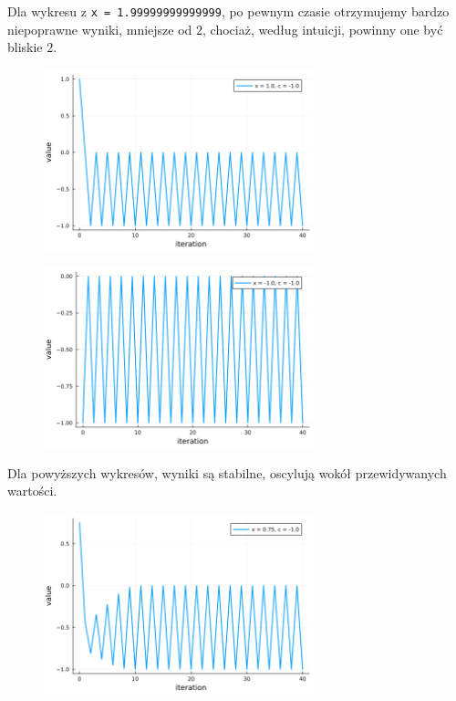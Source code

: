 \documentclass[15pt, a4paper]{article}
\begin{document}
\vspace{0.5cm}

\noindent Dla wykresu z \verb|x = 1.99999999999999|, po pewnym czasie otrzymujemy bardzo niepoprawne wyniki, mniejsze od 2, chociaż, według intuicji, powinny one być bliskie 2.

\vspace{0.5cm}

\begin{figure}[h]
    \centering
    \includegraphics[width=0.7\textwidth]{img/6_4_plot.png}
\end{figure}

\begin{figure}[h]
    \centering
    \includegraphics[width=0.7\textwidth]{img/6_5_plot.png}
\end{figure}

\vspace{0.5cm}

\noindent Dla powyższych wykresów, wyniki są stabilne, oscylują wokół przewidywanych wartości.

\vspace{0.5cm}

\begin{figure}[h]
    \centering
    \includegraphics[width=0.7\textwidth]{img/6_6_plot.png}
\end{figure}
\end{document}
